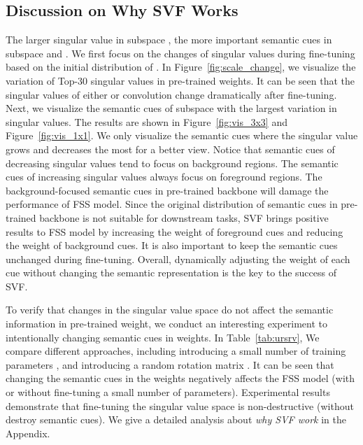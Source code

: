 \documentclass{article}
\begin{document}
\subsection{Discussion on Why SVF Works}
\vspace{-0.5em}
The larger singular value in subspace , the more important semantic cues in subspace  and . We first focus on the changes of singular values during fine-tuning based on the initial distribution of . In Figure~\ref{fig:scale_change}, we visualize the variation of Top-30 singular values in pre-trained weights. It can be seen that the singular values of either  or  convolution change dramatically after fine-tuning. Next, we visualize the semantic cues of subspace  with the largest variation in singular values. The results are shown in Figure~\ref{fig:vis_3x3} and Figure~\ref{fig:vis_1x1}. We only visualize the semantic cues where the singular value grows and decreases the most for a better view. Notice that semantic cues of decreasing singular values tend to focus on background regions. The semantic cues of increasing singular values always focus on foreground regions. The background-focused semantic cues in pre-trained backbone will damage the performance of FSS model. Since the original distribution of semantic cues in pre-trained backbone is not suitable for downstream tasks, SVF brings positive results to FSS model by increasing the weight of foreground cues and reducing the weight of background cues. It is also important to keep the semantic cues unchanged during fine-tuning. Overall, dynamically adjusting the weight of each cue without changing the semantic representation is the key to the success of SVF. 

To verify that changes in the singular value space do not affect the semantic information in pre-trained weight, we conduct an interesting experiment to intentionally changing semantic cues in weights. In Table~\ref{tab:ursrv}, We compare different approaches, including introducing a small number of training parameters , and introducing a random rotation matrix . It can be seen that changing the semantic cues in the weights negatively affects the FSS model (with or without fine-tuning a small number of parameters). Experimental results demonstrate that fine-tuning the singular value space is non-destructive (without destroy semantic cues). We give a detailed analysis about {\em why SVF work} in the Appendix.
\vspace{-0.9em}
\end{document}
